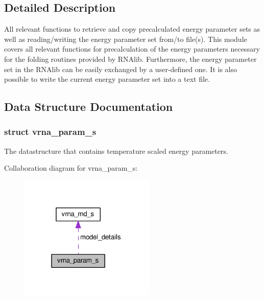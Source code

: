 \subsection{Detailed Description}
All relevant functions to retrieve and copy precalculated energy parameter sets as well as reading/writing the energy parameter set from/to file(s). This module covers all relevant functions for precalculation of the energy parameters necessary for the folding routines provided by R\-N\-Alib. Furthermore, the energy parameter set in the R\-N\-Alib can be easily exchanged by a user-\/defined one. It is also possible to write the current energy parameter set into a text file. 

\subsection{Data Structure Documentation}
\label{structvrna__param__s}
\hypertarget{group__energy__parameters_structvrna__param__s}{}
\subsubsection{struct vrna\-\_\-param\-\_\-s}
The datastructure that contains temperature scaled energy parameters. 

Collaboration diagram for vrna\-\_\-param\-\_\-s\-:
\nopagebreak
\begin{figure}[H]
\begin{center}
\leavevmode
\includegraphics[width=183pt]{structvrna__param__s__coll__graph}
\end{center}
\end{figure}
